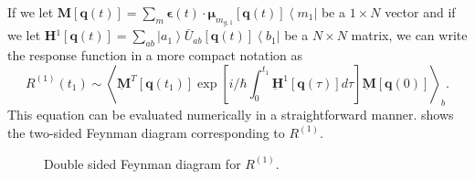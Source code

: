 \documentclass{article}
\newcommand{\bra}[1]{\ensuremath{\left\langle#1\right|}}
\newcommand{\ket}[1]{\ensuremath{\left|#1\right\rangle}}
\newcommand{\vect}[1]{\ensuremath{\boldsymbol{\mathbf{#1}}}}
\newcommand{\arw}{-{Latex[length=2mm]}}
\begin{document}
If we let \underline{$\vect M$}$[\vect q(t)]=\sum_{m}\vect\epsilon(t)\cdot \vect\mu_{m_{g,1}}[\vect q(t)] \bra{m_{1}}$ be a $1\times N$ vector and if we let \underline{$\vect H$}$^{1}[\vect q(t)]=\sum_{ab}\ket{a_{1}}\bar U_{ab}[\vect q(t)]\bra{b_{1}}$ be a $N\times N$ matrix, we can write the response function in a more compact notation as
\begin{equation}
R^{(1)}(t_{1})\sim\left\langle \underbar{\vect{M}}^{T}[\vect q(t_{1})]\exp\left[i/\hbar\int_{0}^{t_{1}}\underbar{\vect{H}}^{1}[\vect q(\tau)]d\tau\right] \underbar{\vect{M}} [\vect q(0)] \right\rangle_{b}.
\end{equation}
This equation can be evaluated numerically in a straightforward manner.
 shows the two-sided Feynman diagram corresponding to $R^{(1)}$.

\begin{figure}
\centering
{}
\caption{Double sided Feynman diagram for $R^(1)$.}\label{fig:fd1}
\end{figure}
\end{document}
